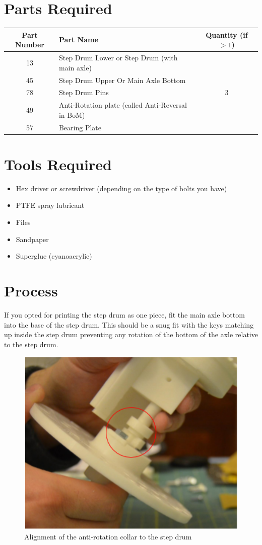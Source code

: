 \documentclass[openany]{book}
\begin{document}
\section{Parts Required}

\begin{table}[!ht]
 \centering
 \begin{tabular}{clc}
    Part Number & Part Name & Quantity (if $>1$) \\ \hline
     13 & Step Drum Lower or Step Drum (with main axle) & \\
     45 & Step Drum Upper Or Main Axle Bottom & \\
     78 & Step Drum Pins & 3 \\
     49 & Anti-Rotation plate (called Anti-Reversal in BoM) & \\
     57 & Bearing Plate & 
 \end{tabular}
\end{table}

\section{Tools Required}

\begin{itemize}
 \item Hex driver or screwdriver (depending on the type of bolts you have)
 \item PTFE spray lubricant
 \item Files
 \item Sandpaper
 \item Superglue (cyanoacrylic)
\end{itemize}




\section{Process}
If you opted for printing the step drum as one piece, fit the main axle bottom into the base of the
step drum. This should be a snug fit with the keys matching up inside the step drum preventing any
rotation of the bottom of the axle relative to the step drum.


\begin{figure}[!ht]
 \centering
 \includegraphics[width=.5\textwidth]{images/anti-rotation-collar.png}
 \caption{Alignment of the anti-rotation collar to the step drum}
\end{figure}
\end{document}
